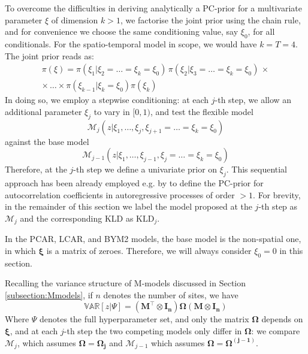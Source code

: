 \documentclass[openany, 11pt, oneside]{book}
\begin{document}
To overcome the difficulties in deriving analytically a PC-prior for a multivariate parameter $\xi$ of dimension $k>1$, we factorise the joint prior using the chain rule, and for convenience we choose the same conditioning value, say $\xi_0$, for all conditionals. For the spatio-temporal model in scope, we would have $k=T=4$. The joint prior reads as:
\begin{align*}
\pi(\xi) = \pi(\xi_1 \vert \xi_2 =  \dots = \xi_{k} = \xi_0)\, 
\pi(\xi_2 \vert \xi_3 = \dots = \xi_{k} = \xi_0) \, \times \\ \times\, \dots \times
\pi(\xi_{k-1} \vert \xi_{k}=\xi_0) \pi(\xi_k)
\end{align*}
In doing so, we employ a stepwise conditioning: at each $j$-th step, we allow an additional parameter $\xi_j$ to vary in $[0, 1)$, and test the flexible model %
$$\mathcal{M}_j\left(z\vert\xi_1, \dots, \xi_j, \xi_{j+1}=\dots=\xi_{k} = \xi_0\right)$$
against the base model 
$$\mathcal{M}_{j-1}\left(z\vert\xi_1, \dots, \xi_{j-1}, \xi_j =\dots=\xi_{k} = \xi_0\right)$$ Therefore, at the $j$-th step we define a univariate prior on $\xi_j$. This sequential approach has been already employed e.g. by \textcite{Sorbye2017} to define the PC-prior for autocorrelation coefficients in autoregressive processes of order $>1$. For brevity, in the remainder of this section we label the model proposed at the $j$-th step as $\mathcal{M}_j$ and the corresponding KLD as $\mathrm{KLD}_j$.

In the PCAR, LCAR, and BYM2 models, the base model is the non-spatial one, in which $\boldsymbol{\xi}$ is a  matrix of zeroes. Therefore, we will always consider $\xi_0 = 0$ in this section.

Recalling the variance structure of M-models discussed in Section \ref{subsection:Mmodels}, if $n$ denotes the number of sites, we have 
$$
\mathbb{VAR}[z \vert \Psi] = \left( \boldsymbol{M^\top} \otimes \boldsymbol{I_n} \right) \boldsymbol{\Omega} \left( \boldsymbol{M} \otimes \boldsymbol{I_n} \right) 
$$
Where $\Psi$ denotes the full hyperparameter set, and only the matrix $\boldsymbol{\Omega}$ depends on $\boldsymbol{\xi}$, and at each $j$-th step the two competing models only differ in $\boldsymbol{\Omega}$: we compare $\mathcal{M}_j$, which assumes $\boldsymbol{\Omega}=\boldsymbol{\Omega_j}$ and $\mathcal{M}_{j-1}$ which assumes $\boldsymbol{\Omega}=\boldsymbol{\Omega^{(j-1)}}$. 
\end{document}
